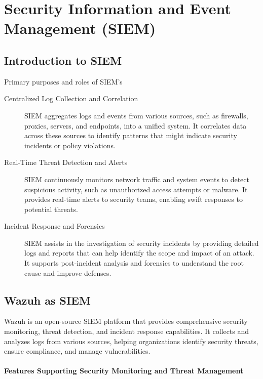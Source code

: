 \documentclass[12pt,a4paper]{report}
\begin{document}
\section{Security Information and Event Management (SIEM)}

\subsection{Introduction to SIEM}
Primary purposes and roles of SIEM's

\begin{description}
	\item[Centralized Log Collection and Correlation] SIEM aggregates logs and events from various sources, such as firewalls, proxies, servers, and endpoints, into a unified system. It correlates data across these sources to identify patterns that might indicate security incidents or policy violations.
	
	\item[Real-Time Threat Detection and Alerts] SIEM continuously monitors network traffic and system events to detect suspicious activity, such as unauthorized access attempts or malware. It provides real-time alerts to security teams, enabling swift responses to potential threats.
	
	\item[Incident Response and Forensics] SIEM assists in the investigation of security incidents by providing detailed logs and reports that can help identify the scope and impact of an attack. It supports post-incident analysis and forensics to understand the root cause and improve defenses.
\end{description}

\subsection{Wazuh as SIEM}

Wazuh is an open-source SIEM platform that provides comprehensive security monitoring, threat detection, and incident response capabilities. It collects and analyzes logs from various sources, helping organizations identify security threats, ensure compliance, and manage vulnerabilities.

\paragraph{Features Supporting Security Monitoring and Threat Management}
\end{document}
